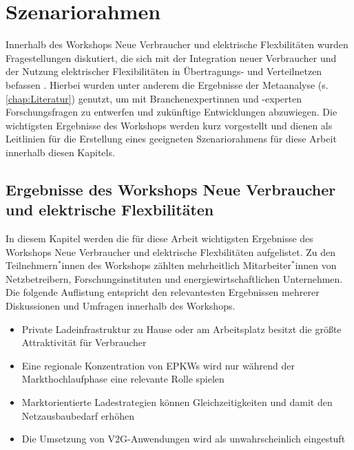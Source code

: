 
\section{Szenariorahmen}\label{chap:Szenariorahmen}

Innerhalb des Workshops \glqq Neue Verbraucher und elektrische Flexbilitäten\grqq{} wurden Fragestellungen diskutiert, die sich mit der Integration neuer Verbraucher und der Nutzung elektrischer Flexibilitäten in Übertragungs- und Verteilnetzen befassen \cite{RLI2020}.
Hierbei wurden unter anderem die Ergebnisse der Metaanalyse (s. \autoref{chap:Literatur}) genutzt, um mit Branchenexpertinnen und -experten Forschungsfragen zu entwerfen und zukünftige Entwicklungen abzuwiegen.
Die wichtigsten Ergebnisse des Workshops werden kurz vorgestellt und dienen als Leitlinien für die Erstellung eines geeigneten Szenariorahmens für diese Arbeit innerhalb diesen Kapitels.


\subsection{Ergebnisse des Workshops \glqq Neue Verbraucher und elektrische Flexbilitäten\grqq{}}

In diesem Kapitel werden die für diese Arbeit wichtigsten Ergebnisse des Workshops \glqq Neue Verbraucher und elektrische Flexbilitäten\grqq{} aufgelistet.
Zu den Teilnehmern$^*$innen des Workshops zählten mehrheitlich Mitarbeiter$^*$innen von Netzbetreibern, Forschungsinstituten und energiewirtschaftlichen Unternehmen.
Die folgende Auflistung entspricht den relevantesten Ergebnissen mehrerer Diskussionen und Umfragen innerhalb des Workshops.

\begin{itemize}
	\item Private Ladeinfrastruktur zu Hause oder am Arbeitsplatz besitzt die größte Attraktivität für Verbraucher
	\item Eine regionale Konzentration von \glspl{EPKW} wird nur während der Markthochlaufphase eine relevante Rolle spielen
	\item Marktorientierte Ladestrategien können Gleichzeitigkeiten und damit den Netzausbaubedarf erhöhen
	\item Die Umsetzung von \gls{V2G}-Anwendungen wird als unwahrscheinlich eingestuft
	
\end{itemize}


